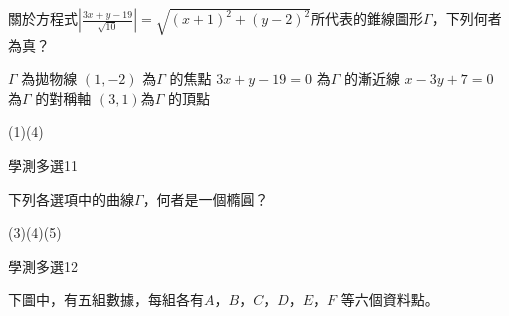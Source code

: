 \begin{QUESTIONS}
\begin{QUESTION}
\begin{QBODY}
            關於方程式$\left| \frac{3x+y-19}{\sqrt{10}} \right|=\sqrt{{{\left( x+1 \right)}^{2}}+{{\left( y-2 \right)}^{2}}}$所代表的錐線圖形$\Gamma $，下列何者為真？
            \begin{QOPS}
                \QOP $\Gamma $ 為拋物線
                \QOP $\left( 1,-2 \right)$ 為$\Gamma $ 的焦點
                \QOP $3x+y-19=0$ 為$\Gamma $ 的漸近線
                \QOP $x-3y+7=0$ 為$\Gamma $ 的對稱軸
                \QOP $\left( 3,1 \right)$為$\Gamma $ 的頂點
            \end{QOPS}
        \end{QBODY}
        \begin{QFROMS}
        \end{QFROMS}
        \begin{QTAGS}\end{QTAGS}
        \begin{QANS}
            (1)(4)
        \end{QANS}
        \begin{QSOLLIST}
        \end{QSOLLIST}
        \begin{QEMPTYSPACE}
        \end{QEMPTYSPACE}
    \end{QUESTION}
    \begin{QUESTION}
        \begin{ExamInfo}{86}{學測}{多選}{11}
        \end{ExamInfo}
        \begin{ExamAnsRateInfo}{}{}{}{}
        \end{ExamAnsRateInfo}
        \begin{QBODY}
            下列各選項中的曲線$\Gamma $，何者是一個橢圓？
        \end{QBODY}
        \begin{QFROMS}
        \end{QFROMS}
        \begin{QTAGS}\end{QTAGS}
        \begin{QANS}
            (3)(4)(5)
        \end{QANS}
        \begin{QSOLLIST}
        \end{QSOLLIST}
        \begin{QEMPTYSPACE}
        \end{QEMPTYSPACE}
    \end{QUESTION}
    \begin{QUESTION}
        \begin{ExamInfo}{86}{學測}{多選}{12}
        \end{ExamInfo}
        \begin{ExamAnsRateInfo}{}{}{}{}
        \end{ExamAnsRateInfo}
        \begin{QBODY}
            下圖中，有五組數據，每組各有$A$，$B$，$C$，$D$，$E$，$F$ 等六個資料點。
            

\end{QBODY}
\end{QUESTION}
\end{QUESTIONS}
